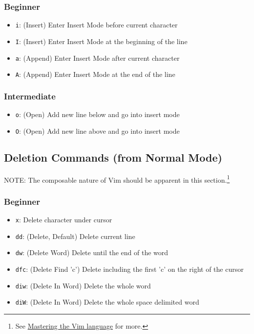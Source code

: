 \documentclass[11pt]{article}
\begin{document}
\subsubsection{Beginner}
\label{sec:org3d0119f}
\begin{itemize}
\item \texttt{i}: (Insert) Enter Insert Mode before current character
\item \texttt{I}: (Insert) Enter Insert Mode at the beginning of the line
\item \texttt{a}: (Append) Enter Insert Mode after current character
\item \texttt{A}: (Append) Enter Insert Mode at the end of the line
\end{itemize}
\subsubsection{Intermediate}
\label{sec:org5d7c533}
\begin{itemize}
\item \texttt{o}: (Open) Add new line below and go into insert mode
\item \texttt{O}: (Open) Add new line above and go into insert mode
\end{itemize}
\subsection{Deletion Commands (from Normal Mode)}
\label{sec:org5905ba9}
NOTE: The composable nature of Vim should be apparent in this section.\footnote{See \href{https://www.youtube.com/watch?v=wlR5gYd6um0}{Mastering the Vim language} for more.} 
\subsubsection{Beginner}
\label{sec:org3acfb2c}
\begin{itemize}
\item \texttt{x}: Delete character under cursor
\item \texttt{dd}: (Delete, Default) Delete current line
\item \texttt{dw}: (Delete Word) Delete until the end of the word
\item \texttt{dfc}: (Delete Find 'c') Delete including the first 'c' on the right of the cursor
\item \texttt{diw}: (Delete In Word) Delete the whole word
\item \texttt{diW}: (Delete In Word) Delete the whole space delimited word
\end{itemize}
\end{document}
